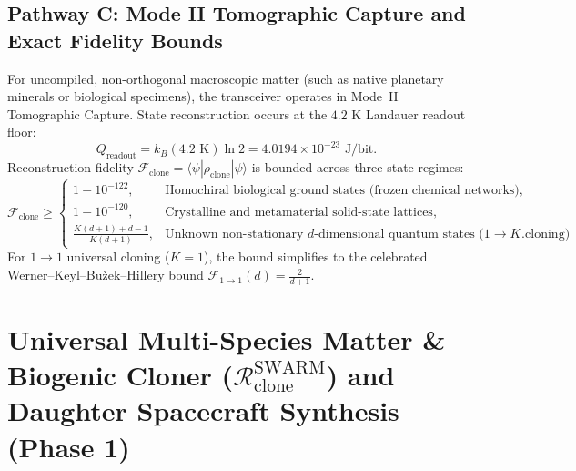 \documentclass[11pt,onecolumn]{article}
\begin{document}
\subsection{Pathway C: Mode II Tomographic Capture and Exact Fidelity Bounds}
For uncompiled, non-orthogonal macroscopic matter (such as native planetary minerals or biological specimens), the transceiver operates in Mode~II Tomographic Capture. State reconstruction occurs at the $4.2\text{ K}$ Landauer readout floor:
\begin{equation}
Q_{\text{readout}} = k_B (4.2\text{ K}) \ln 2 = 4.0194 \times 10^{-23}\text{ J/bit}.
\label{eq:landauer_readout_floor}
\end{equation}
Reconstruction fidelity $\mathcal{F}_{\text{clone}} = \langle\psi|\rho_{\text{clone}}|\psi\rangle$ is bounded across three state regimes:
\begin{equation}
\mathcal{F}_{\text{clone}} \ge \begin{cases}
1 - 10^{-122}, & \text{Homochiral biological ground states (frozen chemical networks)}, \\
1 - 10^{-120}, & \text{Crystalline and metamaterial solid-state lattices}, \\
\frac{K(d+1) + d - 1}{K(d+1)}, & \text{Unknown non-stationary $d$-dimensional quantum states ($1 \to K$ cloning)}.
\end{cases}
\label{eq:fidelity_bounds}
\end{equation}
For $1 \to 1$ universal cloning ($K=1$), the bound simplifies to the celebrated Werner--Keyl--Bu\v{z}ek--Hillery bound $\mathcal{F}_{1\to 1}(d) = \frac{2}{d+1}$.



\FloatBarrier
\section{\texorpdfstring{Universal Multi-Species Matter \& Biogenic Cloner ($\mathcal{R}_{\text{clone}}^{\text{SWARM}}$) and Daughter Spacecraft Synthesis (Phase 1)}{Universal Multi-Species Matter \& Biogenic Cloner (R\_clone\textasciicircum SWARM) and Daughter Spacecraft Synthesis (Phase 1)}}
\end{document}
